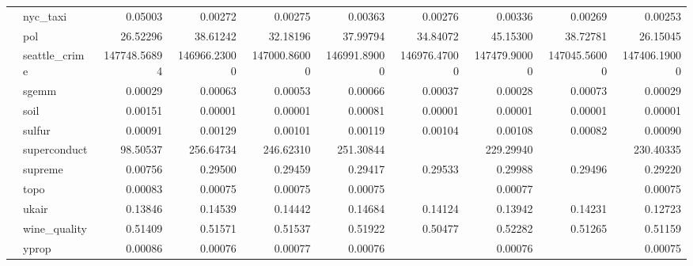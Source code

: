 \begin{tabular}{llrrrrrrrr}
 & nyc_taxi & 0.05003 & 0.00272 & 0.00275 & 0.00363 & 0.00276 & 0.00336 & 0.00269 & 0.00253 \\
 & pol & 26.52296 & 38.61242 & 32.18196 & 37.99794 & 34.84072 & 45.15300 & 38.72781 & 26.15045 \\
 & seattle_crime & 147748.56894 & 146966.23000 & 147000.86000 & 146991.89000 & 146976.47000 & 147479.90000 & 147045.56000 & 147406.19000 \\
 & sgemm & 0.00029 & 0.00063 & 0.00053 & 0.00066 & 0.00037 & 0.00028 & 0.00073 & 0.00029 \\
 & soil & 0.00151 & 0.00001 & 0.00001 & 0.00081 & 0.00001 & 0.00001 & 0.00001 & 0.00001 \\
 & sulfur & 0.00091 & 0.00129 & 0.00101 & 0.00119 & 0.00104 & 0.00108 & 0.00082 & 0.00090 \\
 & superconduct & 98.50537 & 256.64734 & 246.62310 & 251.30844 &  & 229.29940 &  & 230.40335 \\
 & supreme & 0.00756 & 0.29500 & 0.29459 & 0.29417 & 0.29533 & 0.29988 & 0.29496 & 0.29220 \\
 & topo & 0.00083 & 0.00075 & 0.00075 & 0.00075 &  & 0.00077 &  & 0.00075 \\
 & ukair & 0.13846 & 0.14539 & 0.14442 & 0.14684 & 0.14124 & 0.13942 & 0.14231 & 0.12723 \\
 & wine_quality & 0.51409 & 0.51571 & 0.51537 & 0.51922 & 0.50477 & 0.52282 & 0.51265 & 0.51159 \\
 & yprop & 0.00086 & 0.00076 & 0.00077 & 0.00076 &  & 0.00076 &  & 0.00075 \\
\bottomrule
\end{tabular}
